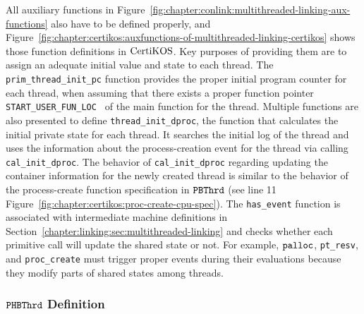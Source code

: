 All auxiliary functions in Figure~\ref{fig:chapter:conlink:multithreaded-linking-aux-functions}  also have to be defined 
properly, and Figure~\ref{fig:chapter:certikos:auxfunctions-of-multithreaded-linking-certikos} shows
those function definitions in $\mathrm{CertiKOS}$. 
Key purposes of providing them are to assign an adequate initial value and state to each thread.
The \lstinline$prim_thread_init_pc$ function provides the proper initial program counter for each thread, 
when assuming that there exists a proper function pointer \lstinline$START_USER_FUN_LOC $ 
of the main function for the thread.
Multiple functions are also presented to define \lstinline$thread_init_dproc$, the function that calculates the initial private state for each thread. 
It searches the initial log of the thread and
uses the information about the process-creation event  for the thread via
calling \lstinline$cal_init_dproc$.
The behavior of  \lstinline$cal_init_dproc$ regarding updating the container information for the newly created thread is similar to the behavior 
of the process-create function specification in ${{\mathrm{\texttt{PBThrd}}}}$ (see line 11
Figure~\ref{fig:chapter:certikos:proc-create-cpu-spec}).
The \lstinline$has_event$ function is associated with  intermediate machine definitions in Section~\ref{chapter:linking:sec:multithreaded-linking}
and checks 
whether each primitive call will update the shared state or not.
For example, ${\mathrm{\texttt{palloc}}}$, \lstinline$pt_resv$, and \lstinline$proc_create$ must
trigger  proper events during their evaluations because they modify parts of shared states
among threads.



\subsubsection{${{\mathrm{\texttt{PHBThrd}}}}$ Definition}


